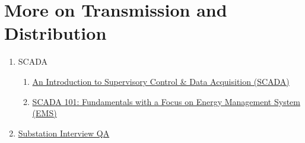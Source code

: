 \chapter{More on Transmission and Distribution}

\begin{enumerate}
    \item SCADA 
    \begin{enumerate}
        \item \href{https://www.solisplc.com/scada}{An Introduction to Supervisory Control \& Data Acquisition (SCADA)}
        \item \href{https://www.euci.com/event_post/scada-fundamentals-energy-management-system/}{SCADA 101: Fundamentals with a Focus on Energy Management System (EMS)}
    \end{enumerate}
    \item \href{https://www.eeeguide.com/substations-interview-questions-and-answers/}{Substation Interview QA}
\end{enumerate}